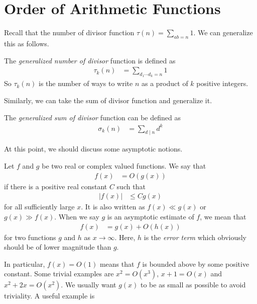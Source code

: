 \documentclass[elemannt.tex]{subfile}
\begin{document}
	\section{Order of Arithmetic Functions}
	Recall that the number of divisor function $\tau(n)=\sum_{ab=n}1$. We can generalize this as follows.
		\begin{definition}
			The \textit{generalized number of divisor} function is defined as
				\begin{align*}
					\tau_{k}(n)
						& = \sum_{d_{1}\cdots d_{k}=n}1
				\end{align*}
			So $\tau_{k}(n)$ is the number of ways to write $n$ as a product of $k$ positive integers. 
		\end{definition}
	Similarly, we can take the sum of divisor function and generalize it.
		\begin{definition}
			The \textit{generalized sum of divisor} function can be defined as
				\begin{align*}
					\sigma_{k}(n)
						& = \sum_{d\mid n}d^{k}
				\end{align*}
		\end{definition}
	At this point, we should discuss some asymptotic notions.
		\begin{definition}[Big O]
			Let $f$ and $g$ be two real or complex valued functions. We say that
				\begin{align*}
					f(x)
					& = O(g(x))
				\end{align*}
			if there is a positive real constant $C$ such that
				\begin{align*}
					|f(x)|
					& \leq Cg(x)
				\end{align*}
			for all sufficiently large $x$. It is also written as $f(x)\ll g(x)$  or $g(x)\gg f(x)$. When we say $g$ is an asymptotic estimate of $f$, we mean that
				\begin{align*}
					f(x)
						& = g(x)+O(h(x))
				\end{align*}
			for two functions $g$ and $h$ as $x\to\infty$. Here, $h$ is the \textit{error term} which obviously should be of lower magnitude than $g$.
		\end{definition}
	In particular, $f(x)=O(1)$ means that $f$ is bounded above by some positive constant. Some trivial examples are $x^{2}=O(x^{3})$, $x+1=O(x)$ and $x^{2}+2x=O(x^{2})$. We usually want $g(x)$ to be as small as possible to avoid triviality. A useful example is
\end{document}
